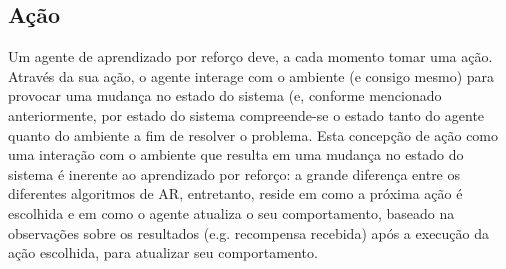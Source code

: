 \documentclass[cic,tc]{iiufrgs}
\newcommand\bruno[1]{\textcolor{magenta}{#1}}
\begin{document}
\subsection{Ação}
Um agente de aprendizado por reforço deve, a cada momento tomar uma ação. Através da sua ação, o agente interage com o ambiente (e consigo mesmo)
para provocar uma mudança no estado do sistema (e, conforme mencionado anteriormente, por estado do sistema compreende-se o estado tanto do agente quanto do ambiente
 a fim de resolver
o problema. Esta concepção de ação como uma interação com o ambiente que resulta em uma mudança no estado do sistema é inerente ao aprendizado por reforço:
a grande diferença entre os diferentes algoritmos de AR, entretanto, reside em como a próxima ação é escolhida e em como o agente atualiza o seu comportamento,
 baseado na observações sobre os resultados (e.g. recompensa recebida) após a execução da ação escolhida, para atualizar seu comportamento.
%
\end{document}
